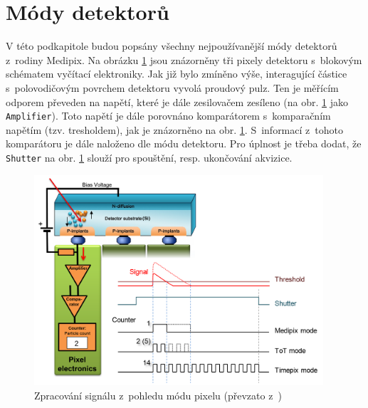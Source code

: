 \section{Módy detektorů}\label{det:mod}
V této podkapitole budou popsány všechny nejpoužívanější módy detektorů z~rodiny Medipix. 
Na obrázku \ref{fig:det:signal_proc} jsou znázorněny tři pixely detektoru s~blokovým schématem vyčítací elektroniky. Jak již bylo zmíněno výše, interagující částice s~polovodičovým povrchem detektoru vyvolá proudový pulz. Ten je měřícím odporem převeden na napětí, které je dále zesilovačem zesíleno (na obr. \ref{fig:det:signal_proc} jako \texttt{Amplifier}). Toto napětí je dále porovnáno komparátorem s~komparačním napětím (tzv. tresholdem), jak je znázorněno na obr. \ref{fig:det:signal_proc}. S~informací z~tohoto komparátoru je dále naloženo dle módu detektoru. Pro úplnost je třeba dodat, že \texttt{Shutter} na obr. \ref{fig:det:signal_proc} slouží pro spouštění, resp. ukončování akvizice.

\begin{figure}[th!]
	\begin{center}
		\includegraphics[width=10.75cm]{figures/det_pix.png}
		\caption{Zpracování signálu z~pohledu módu pixelu (převzato z~\cite{PlatkevicDisertace})}
		\label{fig:det:signal_proc}
	\end{center}
\end{figure}

